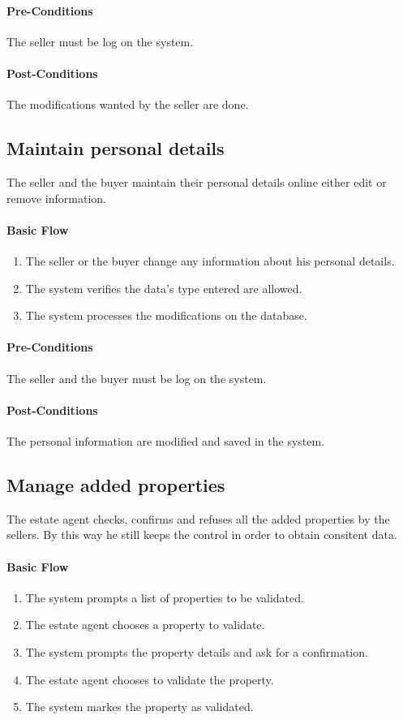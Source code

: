 \documentclass[a4paper,12pt]{article}
\begin{document}
\paragraph{Pre-Conditions}
The seller must be log on the system.
\paragraph{Post-Conditions}
The modifications wanted by the seller are done.

\subsection{Maintain personal details}

The seller and the buyer maintain their personal details online either edit or remove information.

\paragraph{Basic Flow}
\begin{enumerate}
\item The seller or the buyer change any information about his personal details.
\item The system verifies the data's type entered are allowed.
\item The system processes the modifications on the database.
\end{enumerate}
\paragraph{Pre-Conditions}
The seller and the buyer must be log on the system.
\paragraph{Post-Conditions}
The personal information are modified and saved in the system.

\subsection{Manage added properties}

The estate agent checks, confirms and refuses all the added properties by the sellers. By this way he still keeps the control in order to obtain consitent data.

\paragraph{Basic Flow}
\begin{enumerate}
\item The system prompts a list of properties to be validated.
\item The estate agent chooses a property to validate.
\item The system prompts the property details and ask for a confirmation.
\item The estate agent chooses to validate the property.
\item The system markes the property as validated.
\end{enumerate}
\end{document}
